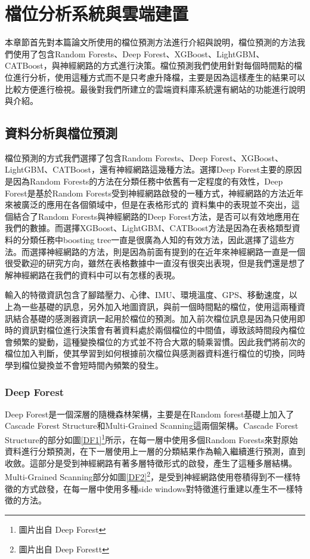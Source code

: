 \chapter{檔位分析系統與雲端建置}
本章節首先對本篇論文所使用的檔位預測方法進行介紹與說明，檔位預測的方法我們使用了包含Random Forests、Deep Forest、XGBoost、LightGBM、CATBoost，與神經網路的方式進行決策。檔位預測我們使用針對每個時間點的檔位進行分析，使用這種方式而不是只考慮升降檔，主要是因為這樣產生的結果可以比較方便進行檢視。最後對我們所建立的雲端資料庫系統還有網站的功能進行說明與介紹。



\section{資料分析與檔位預測}
檔位預測的方式我們選擇了包含Random Forests、Deep Forest、XGBoost、LightGBM、CATBoost，還有神經網路這幾種方法。選擇Deep Forest主要的原因是因為Random Forests的方法在分類任務中依舊有一定程度的有效性，Deep Forest是基於Random Forests受到神經網路啟發的一種方式，神經網路的方法近年來被廣泛的應用在各個領域中，但是在表格形式的 資料集中的表現並不突出，這個結合了Random Forests與神經網路的Deep Forest方法，是否可以有效地應用在我們的數據。而選擇XGBoost、LightGBM、CATBoost方法是因為在表格類型資料的分類任務中boosting tree一直是很廣為人知的有效方法，因此選擇了這些方法。而選擇神經網路的方法，則是因為前面有提到的在近年來神經網路一直是一個很受歡迎的研究方向，雖然在表格數據中一直沒有很突出表現，但是我們還是想了解神經網路在我們的資料中可以有怎樣的表現。

輸入的特徵資訊包含了腳踏壓力、心律、IMU、環境溫度、GPS、移動速度，以上為一些基礎的訊息，另外加入地圖資訊，與前一個時間點的檔位，使用這兩種資訊結合基礎的感測器資訊一起用於檔位的預測。加入前次檔位訊息是因為只使用即時的資訊對檔位進行決策會有著資料處於兩個檔位的中間值，導致該時間段內檔位會頻繁的變動，這種變換檔位的方式並不符合大眾的騎乘習慣。因此我們將前次的檔位加入判斷，使其學習到如何根據前次檔位與感測器資料進行檔位的切換，同時學到檔位變換並不會短時間內頻繁的發生。


\subsection{Deep Forest}
Deep Forest是一個深層的隨機森林架構，主要是在Random forest基礎上加入了Cascade Forest Structure和Multi-Grained Scanning這兩個架構。Cascade Forest Structure的部分如圖\ref{DF1}\footnote{圖片出自 Deep Forest\cite{zhou2017deep}}所示，在每一層中使用多個Random Forests來對原始資料進行分類預測，在下一層使用上一層的分類結果作為輸入繼續進行預測，直到收斂。這部分是受到神經網路有著多層特徵形式的啟發，產生了這種多層結構。Multi-Grained Scanning部分如圖\ref{DF2}\footnote{圖片出自 Deep Forestt\cite{zhou2017deep}}，是受到神經網路使用卷積得到不一樣特徵的方式啟發，在每一層中使用多種side windows對特徵進行重建以產生不一樣特徵的方法。

